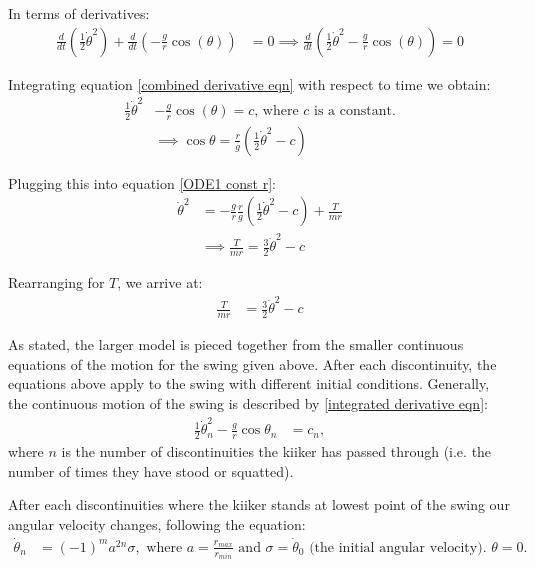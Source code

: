 \documentclass[12pt]{article}
\begin{document}
In terms of derivatives:
\begin{align}
    \frac{d}{dt}(\frac{1}{2}\dot{\theta}^2) + \frac{d}{dt}(-\frac{g}{r}\cos(\theta)) &= 0
    \implies \frac{d}{dt}(\frac{1}{2}\dot{\theta}^2 - \frac{g}{r}\cos(\theta)) = 0 \label{combined derivative eqn}
\end{align}

Integrating equation \ref{combined derivative eqn} with respect to time we obtain:
\begin{align}
    \frac{1}{2}\dot{\theta}^2 &- \frac{g}{r}\cos(\theta) = c \label{integrated derivative eqn}\text{,  where $c$ is a constant.}
    \\&\implies{\cos{\theta} = \frac{r}{g}(\frac{1}{2}\dot{\theta}^2 - c)}
\end{align}

Plugging this into equation \ref{ODE1 const r}:
\begin{align}
    \dot{\theta}^2 &= -\frac{g}{r} \frac{r}{g}(\frac{1}{2}\dot{\theta}^2 - c) + \frac{T}{mr}
    \\&\implies \frac{T}{mr} = \frac{3}{2}\dot{\theta}^2 - c
\end{align}

Rearranging for $T$, we arrive at:
\begin{align}
    \frac{T}{mr} &= \frac{3}{2}\dot{\theta}^2 - c
    \label{tension eqn}
\end{align}

As stated, the larger model is pieced together from the smaller continuous equations of the motion for the swing given above.
After each discontinuity, the equations above apply to the swing with different initial conditions.
Generally, the continuous motion of the swing is described by \ref{integrated derivative eqn}:
\begin{align}
    \frac{1}{2}\dot{\theta}^2_n - \frac{g}{r}\cos{\theta_n}&= c_n,
    \label{coninuous motion eqn}
\end{align}
where $n$ is the number of discontinuities the kiiker has passed through (i.e. the number of times they have stood or squatted).

After each discontinuities where the kiiker stands at lowest point of the swing our angular velocity changes, following the equation:
\begin{align}
    \dot{\theta}_n &= (-1)^{m} a^{2n}\sigma,
    \label{discontinuity reln}
    \text{ where $a = \frac{r_{max}}{r_{min}}$ and $\sigma = \dot{\theta}_0$ (the initial angular velocity). } \theta = 0.
\end{align}
\end{document}
